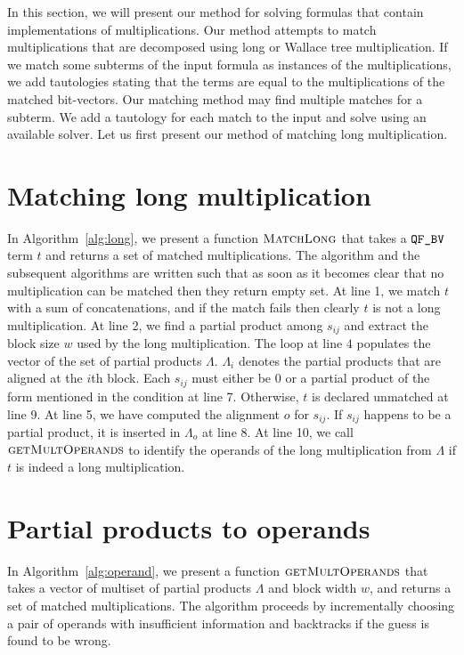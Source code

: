 %
In this section, we will present our method for solving
formulas that contain implementations of multiplications.
%
Our method attempts to match multiplications that
are decomposed using long or Wallace tree multiplication.
%
If we match some subterms of the input formula
as instances of the
multiplications, we add tautologies stating that the terms are 
equal to the multiplications of the matched bit-vectors.
%
Our matching method may find multiple matches for a subterm.
%
We add a tautology for each match to the input and solve using
an available solver.
%
Let us first present our method of matching long multiplication. 

\section{Matching long multiplication}


In Algorithm~\ref{alg:long}, we present a function $\textsc{MatchLong}$
that takes a $\texttt{QF\_BV}$ term $t$ and returns a set of matched multiplications.
%
The algorithm and the subsequent algorithms are written such that as soon
as it becomes clear that no multiplication can be matched then
they return empty set. 
%
At line 1, we match $t$ with a sum of concatenations, and if the match fails
then clearly $t$ is not a long multiplication.
%
At line 2, we find a partial product among $s_{ij}$ and extract
the block size $w$ used by the long multiplication.
%
The loop at line $4$ populates the vector of the set of partial products $\Lambda$.
%
$\Lambda_i$ denotes the partial products that are aligned at the $i$th block.
%
Each $s_{ij}$ must either be $0$ or a partial product of the form mentioned in the
condition at line 7.
%
Otherwise, $t$ is declared unmatched at line 9. 
%
At line 5, we have computed the alignment $o$ for $s_{ij}$.
%
If $s_{ij}$ happens to be a partial product, it is inserted in
$\Lambda_o$ at line 8.
%
At line 10, we call $\textsc{getMultOperands}$ to identify the operands
of the long multiplication from $\Lambda$ if $t$ is indeed a long
multiplication.

\section{Partial products to operands}


In Algorithm~\ref{alg:operand}, we present a function
$\textsc{getMultOperands}$ that takes a vector of multiset of partial
products $\Lambda$ and block width $w$, and returns a set of matched
multiplications.
%
The algorithm proceeds by incrementally choosing a pair of operands with
insufficient information and backtracks if the guess is found to be
wrong.


